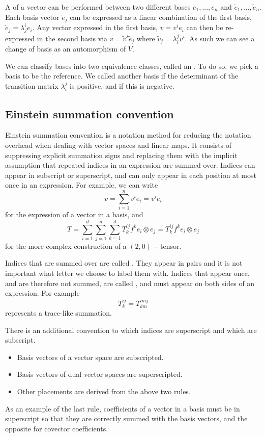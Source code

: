 A  of a vector can be performed between two different bases \(e_1, ..., e_n\) and \(\tilde e_1, ..., \tilde e_n\).
Each basis vector \(\tilde e_j\) can be expressed as a linear combination of the first basis, \(\tilde e_j = \lambda_j^i e_i\).
Any vector expressed in the first basis, \(v = v^i e_i\) can then be re-expressed in the second basis via \(v = \tilde v^j \tilde e_j\) where \( \tilde v_j = \lambda^j_i v^i\).
As such we can see a change of basis as an automorphism of \(V\).

We can classify bases into two equivalence classes, called an .
To do so, we pick a basis to be the reference.
We called another basis  if the determinant of the transition matrix \(\lambda^j_i\) is positive, and  if this is negative.

\subsection{Einstein summation convention}
\label{sec:einsum}
Einstein summation convention is a notation method for reducing the notation overhead when dealing with vector spaces and linear maps.
It consists of suppressing explicit summation signs and replacing them with the implicit assumption that repeated indices in an expression are summed over.
Indices can appear in subscript or superscript, and can only appear in each position at most once in an expression.
For example, we can write
\[
	{v} = \sum_{i=1}^n v^i {e}_i = v^i {e}_i
\]
for the expression of a vector in a basis, and 
\[
	T = \sum_{i=1}^d\sum_{j=1}^d\sum_{k=1}^d T^{ij}_k f^k e_i \otimes e_j = T^{ij}_k f^k e_i \otimes e_j	
\]
for the more complex construction of a \((2,0)-\)tensor.

Indices that are summed over are called .
They appear in pairs and it is not important what letter we choose to label them with.
Indices that appear once, and are therefore not summed, are called , and must appear on both sides of an expression.
For example
\[
	T^{ij}_k = T^{imj}_{km}
\]
represents a trace-like summation.

There is an additional convention to which indices are superscript and which are subscript.
\begin{itemize}
	\item Basis vectors of a vector space are subscripted.
	\item Basis vectors of dual vector spaces are superscripted.
	\item Other placements are derived from the above two rules.
\end{itemize}
As an example of the last rule, coefficients of a vector in a basis must be in superscript so that they are correctly summed with the basis vectors, and the opposite for covector coefficients.

